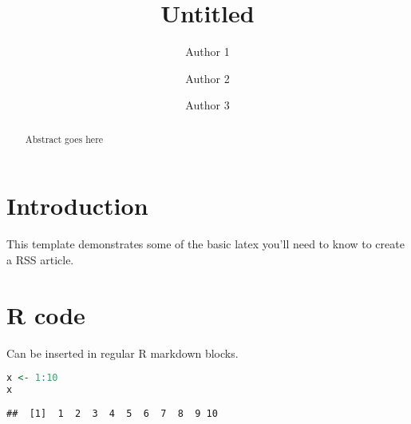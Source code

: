 \documentclass{statsoc}
\title[Untitled]{Untitled}
\author[Author 1 et. al.]{Author 1}
\author[Author 1 et. al.]{Author 2}
\author[Author 1 et. al.]{Author 3}
\begin{document}
\begin{abstract}
Abstract goes here
\end{abstract}

\hypertarget{introduction}{%
\section{Introduction}\label{introduction}}

This template demonstrates some of the basic latex you'll need to know
to create a RSS article.

\hypertarget{r-code}{%
\section{R code}\label{r-code}}

Can be inserted in regular R markdown blocks.

\begin{lstlisting}[language=
R
]
x <- 1:10
x
\end{lstlisting}

\begin{verbatim}
##  [1]  1  2  3  4  5  6  7  8  9 10
\end{verbatim}



\end{document}
